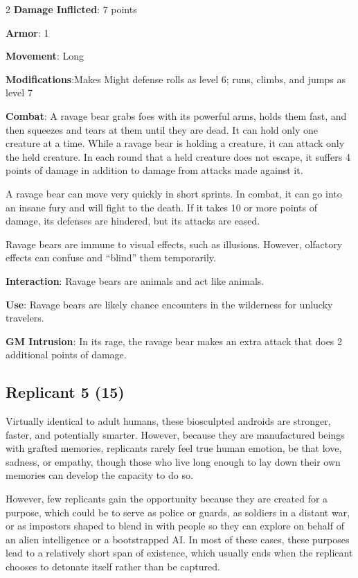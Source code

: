 \begin{multicols}{2}
\textbf{Damage Inflicted}: 7 points

\textbf{Armor}: 1

\textbf{Movement}: Long

\textbf{Modifications}:Makes Might defense rolls as level 6; runs, climbs, and jumps as level 7

\textbf{Combat}: A ravage bear grabs foes with its powerful arms, holds them fast, and then squeezes and tears at them until they are dead. It can hold only one creature at a time. While a ravage bear is holding a creature, it can attack only the held creature. In each round that a held creature does not escape, it suffers 4 points of damage in addition to damage from attacks made against it.

A ravage bear can move very quickly in short sprints. In combat, it can go into an insane fury and will fight to the death. If it takes 10 or more points of damage, its defenses are hindered, but its attacks are eased.

Ravage bears are immune to visual effects, such as illusions. However, olfactory effects can confuse and “blind” them temporarily.

\textbf{Interaction}: Ravage bears are animals and act like animals.

\textbf{Use}: Ravage bears are likely chance encounters in the wilderness for unlucky travelers.

\textbf{GM Intrusion}: In its rage, the ravage bear makes an extra attack that does 2 additional points of damage.

\subsection{Replicant	5 (15)}

Virtually identical to adult humans, these biosculpted androids are stronger, faster, and potentially smarter. However, because they are manufactured beings with grafted memories, replicants rarely feel true human emotion, be that love, sadness, or empathy, though those who live long enough to lay down their own memories can develop the capacity to do so. 

However, few replicants gain the opportunity because they are created for a purpose, which could be to serve as police or guards, as soldiers in a distant war, or as impostors shaped to blend in with people so they can explore on behalf of an alien intelligence or a bootstrapped AI. In most of these cases, these purposes lead to a relatively short span of existence, which usually ends when the replicant chooses to detonate itself rather than be captured.


\end{multicols}

